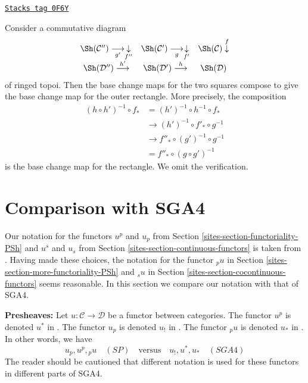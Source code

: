 \begin{remark}
\label{sites-remark-compose-base-change-horizontal}
\href{https://stacks.math.columbia.edu/tag/0F6Y}{\texttt{Stacks tag 0F6Y}}

Consider a commutative diagram
$$
\begin{array}{ccc}\Sh(\mathcal{C}'') \underset{g'}{\longrightarrow}\underset{f''}{\downarrow} & \Sh(\mathcal{C}') \underset{g}{\longrightarrow}\underset{f'}{\downarrow} & \Sh(\mathcal{C}) \overset{f}{\downarrow} \\ \Sh(\mathcal{D}'') \overset{h'}{\longrightarrow} & \Sh(\mathcal{D}') \overset{h}{\longrightarrow} & \Sh(\mathcal{D})\end{array}
$$
of ringed topoi. Then the base change maps
for the two squares compose to give the base
change map for the outer rectangle. More precisely,
the composition
\begin{align*}
(h \circ h')^{-1} \circ f_*
& =
(h')^{-1} \circ h^{-1} \circ f_* \\
& \to (h')^{-1} \circ f'_* \circ g^{-1} \\
& \to f''_* \circ (g')^{-1} \circ g^{-1} \\
& = f''_* \circ (g \circ g')^{-1}
\end{align*}
is the base change map for the rectangle. We omit the verification.
\end{remark}

\section{Comparison with SGA4}
\label{sites-section-notation-comparison}
Our notation for the functors
$u^p$ and $u_p$ from Section \ref{sites-section-functoriality-PSh} and
$u^s$ and $u_s$ from Section \ref{sites-section-continuous-functors}
is taken from \cite[pages 14 and 42]{ArtinTopologies}. Having made these
choices, the notation for the functor
${}_pu$ in Section \ref{sites-section-more-functoriality-PSh} and
${}_su$ in Section \ref{sites-section-cocontinuous-functors}
seems reasonable.
In this section we compare our notation with that of SGA4.

\medskip\noindent
{\bf Presheaves:} Let $u : \mathcal{C} \to \mathcal{D}$ be a functor
between categories.
The functor $u^p$ is denoted $u^*$ in \cite[Exposee I, Section 5]{SGA4}.
The functor $u_p$ is denoted $u_!$ in \cite[Exposee I, Proposition 5.1]{SGA4}.
The functor ${}_pu$ is denoted $u_*$ in
\cite[Exposee I, Proposition 5.1]{SGA4}.
In other words, we have
$$
u_p, u^p, {}_pu\quad(SP)
\quad\text{versus}\quad
u_!, u^*, u_*\quad(SGA4)
$$
The reader should be cautioned that different notation is used for these
functors in different parts of SGA4.

